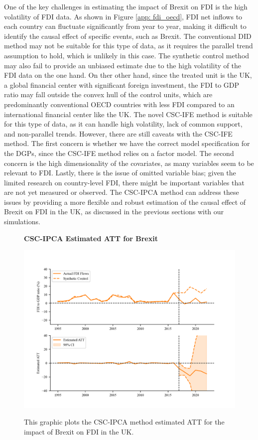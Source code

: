 \documentclass[12pt]{article}
\begin{document}
One of the key challenges in estimating the impact of Brexit on FDI is the high volatility of FDI data. As shown in Figure \ref{app: fdi_oecd}, FDI net inflows to each country can fluctuate significantly from year to year, making it difficult to identify the causal effect of specific events, such as Brexit. The conventional DID method may not be suitable for this type of data, as it requires the parallel trend assumption to hold, which is unlikely in this case. The synthetic control method may also fail to provide an unbiased estimate due to the high volatility of the FDI data on the one hand. On ther other hand, since the treated unit is the UK, a global financial center with significant foreign investment, the FDI to GDP ratio may fall outside the convex hull of the control units, which are predominantly conventional OECD countries with less FDI compared to an international financial center like the UK. The novel CSC-IFE method is suitable for this type of data, as it can handle high volatility, lack of common support, and non-parallel trends. However, there are still caveats with the CSC-IFE method. The first concern is whether we have the correct model specification for the DGPs, since the CSC-IFE method relies on a factor model. The second concern is the high dimensionality of the covariates, as many variables seem to be relevant to FDI. Lastly, there is the issue of omitted variable bias; given the limited research on country-level FDI, there might be important variables that are not yet measured or observed. The CSC-IPCA method can address these issues by providing a more flexible and robust estimation of the causal effect of Brexit on FDI in the UK, as discussed in the previous sections with our simulations.


\begin{figure}[!ht]
    \centering
    \caption{\textbf{CSC-IPCA Estimated ATT for Brexit}}
    \includegraphics{figs/ukfdi_ipca.png}
    \label{fig: ipcs_est}
    \caption*{\footnotesize{This graphic plots the CSC-IPCA method estimated ATT for the impact of Brexit on FDI in the UK.}}
    \end{figure}
\end{document}
